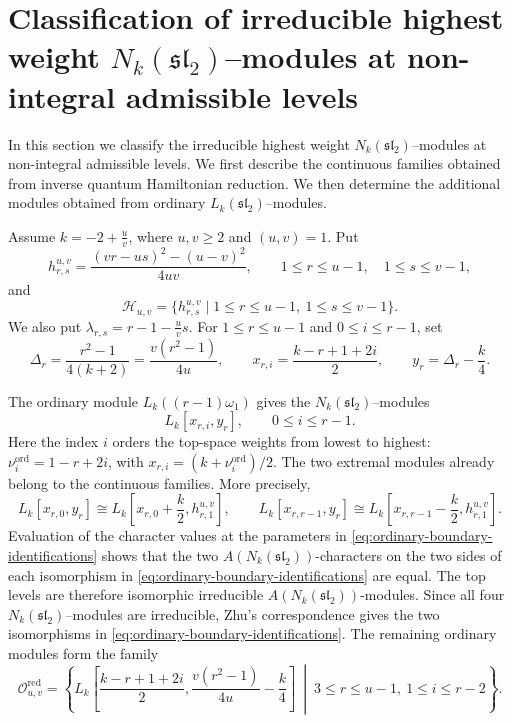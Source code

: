 \documentclass[11 pt]{amsart}
\theoremstyle{definition}
\theoremstyle{plain}
\begin{document}
\section{Classification of irreducible highest weight $N_k(\mathfrak{sl}_2)$--modules at non-integral admissible levels}
\label{sec:admissible}
\label{sec:admissible-simple-quotients}




In this section we classify the irreducible highest weight
$N_k(\mathfrak{sl}_2)$--modules at non-integral admissible levels. We first
describe the continuous families obtained from inverse quantum Hamiltonian
reduction. We then determine the additional modules obtained from ordinary
$L_k(\mathfrak{sl}_2)$--modules.
\vskip 5mm

Assume $k=-2+\frac{u}{v}$, where $u,v\ge2$ and $(u,v)=1$.
Put
\[
  h^{u,v}_{r,s}
  =\frac{(vr-us)^2-(u-v)^2}{4uv},
  \qquad
  1\le r\le u-1,\quad 1\le s\le v-1,
\]
and
\[
  \mathcal H_{u,v}=\{h^{u,v}_{r,s}\mid
  1\le r\le u-1,\ 1\le s\le v-1\}.
\]
We also put $\lambda_{r,s}=r-1-\frac{u}{v}s$.
For $1\le r\le u-1$ and $0\le i\le r-1$, set
\[
  \Delta_r=\frac{r^2-1}{4(k+2)}=\frac{v(r^2-1)}{4u},
  \qquad
  x_{r,i}=\frac{k-r+1+2i}{2},
  \qquad
  y_r=\Delta_r-\frac{k}{4}.
\]

The ordinary module $L_k((r-1)\omega_1)$ gives the
$N_k(\mathfrak{sl}_2)$--modules
\[
  L_k[x_{r,i},y_r],\qquad 0\le i\le r-1.
\]
Here the index $i$ orders the top-space weights from lowest to highest:
$\nu_i^{\mathrm{ord}}=1-r+2i$, with
$x_{r,i}=(k+\nu_i^{\mathrm{ord}})/2$.
The two extremal modules already belong to the continuous families. More
precisely,
\begin{equation}\label{eq:ordinary-boundary-identifications}
  L_k[x_{r,0},y_r]
  \cong
  L_k\left[x_{r,0}+\frac{k}{2},h^{u,v}_{r,1}\right],
  \qquad
  L_k[x_{r,r-1},y_r]
  \cong
  L_k\left[x_{r,r-1}-\frac{k}{2},h^{u,v}_{r,1}\right].
\end{equation}
Evaluation of the character values at the parameters in
\eqref{eq:ordinary-boundary-identifications} shows that the two
$A(N_k(\mathfrak{sl}_2))$-characters on the two sides of each
isomorphism in \eqref{eq:ordinary-boundary-identifications} are equal.
The top levels are therefore isomorphic irreducible
$A(N_k(\mathfrak{sl}_2))$-modules. Since all four
$N_k(\mathfrak{sl}_2)$--modules are irreducible, Zhu's correspondence
gives the two isomorphisms in
\eqref{eq:ordinary-boundary-identifications}. The remaining ordinary
modules form the family
\begin{equation}\label{eq:Oreduced-explicit}
  \mathcal O^{\mathrm{red}}_{u,v}
  =
  \left\{
  L_k\left[
  \frac{k-r+1+2i}{2},
  \frac{v(r^2-1)}{4u}-\frac{k}{4}
  \right]
  \ \middle|\
  3\le r\le u-1,
  \ 1\le i\le r-2
  \right\}.
\end{equation}
\end{document}
